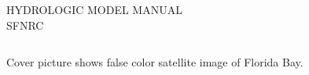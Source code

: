 \color{black}
\vfill
\large
HYDROLOGIC MODEL MANUAL
\\[-0.05in]

SFNRC \reportnumber

\clearpage

\thispagestyle{empty}

\begin{verbatim}
\end{verbatim}
\vfill
\rmfamily
\small
Cover picture shows false color satellite image of Florida Bay.

\normalsize
\cleardoublepage
